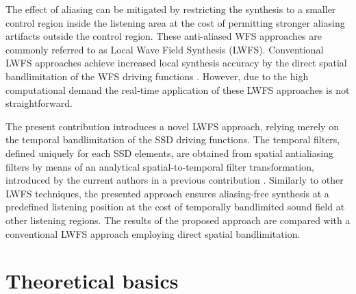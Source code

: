 \documentclass[conference]{IEEEtran}
\begin{document}
The effect of aliasing can be mitigated by restricting the synthesis to a smaller control region inside the listening area at the cost of permitting stronger aliasing artifacts outside the control region.
These anti-aliased WFS approaches are commonly referred to as Local Wave Field Synthesis (LWFS).
Conventional LWFS approaches achieve increased local synthesis accuracy by the direct spatial bandlimitation of the WFS driving functions \cite{Winter2016-TASL, Hahn17:EUSIPCO}.
However, due to the high computational demand the real-time application of these LWFS approaches is not straightforward.

The present contribution introduces a novel LWFS approach, relying merely on the temporal bandlimitation of the SSD driving functions.
The temporal filters, defined uniquely for each SSD elements, are obtained from spatial antialiasing filters by means of an analytical spatial-to-temporal filter transformation, introduced by the current authors in a previous contribution \cite{firtha_daga2023}.
Similarly to other LWFS techniques, the presented approach ensures aliasing-free synthesis at a predefined listening position at the cost of temporally bandlimited sound field at other listening regions.
The results of the proposed approach are compared with a conventional LWFS approach employing direct spatial bandlimitation.

\section{Theoretical basics}
\end{document}

